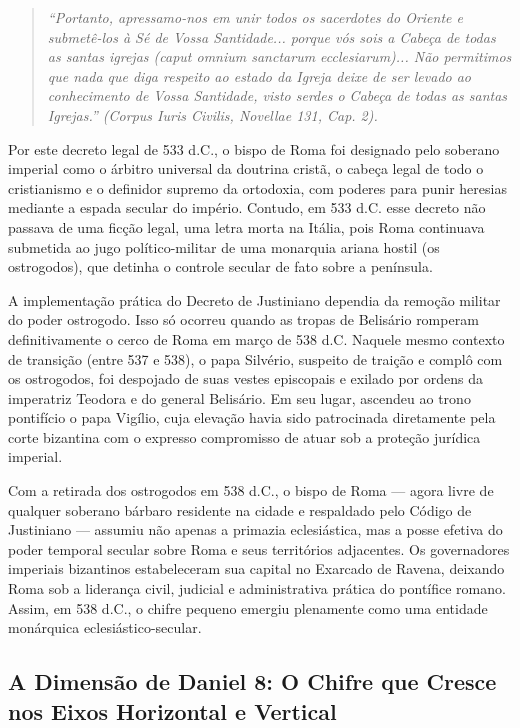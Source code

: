 \begin{quote}
\itshape ``Portanto, apressamo-nos em unir todos os sacerdotes do Oriente e submetê-los à Sé de Vossa Santidade... porque vós sois a Cabeça de todas as santas igrejas (\textit{caput omnium sanctarum ecclesiarum})... Não permitimos que nada que diga respeito ao estado da Igreja deixe de ser levado ao conhecimento de Vossa Santidade, visto serdes o Cabeça de todas as santas Igrejas.'' (\textit{Corpus Iuris Civilis}, Novellae 131, Cap. 2).
\end{quote}


Por este decreto legal de 533 d.C., o bispo de Roma foi designado pelo soberano imperial como o árbitro universal da doutrina cristã, o cabeça legal de todo o cristianismo e o definidor supremo da ortodoxia, com poderes para punir heresias mediante a espada secular do império. Contudo, em 533 d.C. esse decreto não passava de uma ficção legal, uma letra morta na Itália, pois Roma continuava submetida ao jugo político-militar de uma monarquia ariana hostil (os ostrogodos), que detinha o controle secular de fato sobre a península.

A implementação prática do Decreto de Justiniano dependia da remoção militar do poder ostrogodo. Isso só ocorreu quando as tropas de Belisário romperam definitivamente o cerco de Roma em março de 538 d.C. Naquele mesmo contexto de transição (entre 537 e 538), o papa Silvério, suspeito de traição e complô com os ostrogodos, foi despojado de suas vestes episcopais e exilado por ordens da imperatriz Teodora e do general Belisário. Em seu lugar, ascendeu ao trono pontifício o papa Vigílio, cuja elevação havia sido patrocinada diretamente pela corte bizantina com o expresso compromisso de atuar sob a proteção jurídica imperial.

Com a retirada dos ostrogodos em 538 d.C., o bispo de Roma — agora livre de qualquer soberano bárbaro residente na cidade e respaldado pelo Código de Justiniano — assumiu não apenas a primazia eclesiástica, mas a posse efetiva do poder temporal secular sobre Roma e seus territórios adjacentes. Os governadores imperiais bizantinos estabeleceram sua capital no Exarcado de Ravena, deixando Roma sob a liderança civil, judicial e administrativa prática do pontífice romano. Assim, em 538 d.C., o chifre pequeno emergiu plenamente como uma entidade monárquica eclesiástico-secular.



\subsection{A Dimensão de Daniel 8: O Chifre que Cresce nos Eixos Horizontal e Vertical}


